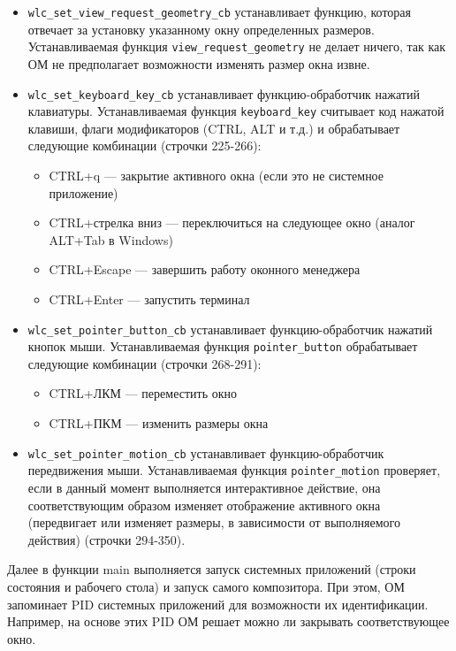 \begin{itemize}
\item \texttt{wlc\_set\_view\_request\_geometry\_cb} устанавливает функцию, которая отвечает за установку указанному окну определенных размеров. Устанавливаемая функция \texttt{view\_request\_geometry} не делает ничего, так как ОМ не предполагает возможности изменять размер окна извне.

\item \texttt{wlc\_set\_keyboard\_key\_cb} устанавливает функцию-обработчик нажатий клавиатуры. Устанавливаемая функция \texttt{keyboard\_key} считывает код нажатой клавиши, флаги модификаторов (CTRL, ALT и т.д.) и обрабатывает следующие комбинации (строчки 225-266):
\begin{itemize}
\item CTRL+q --- закрытие активного окна (если это не системное приложение)
\item CTRL+стрелка вниз --- переключиться на следующее окно (аналог ALT+Tab в Windows)
\item CTRL+Escape --- завершить работу оконного менеджера
\item CTRL+Enter --- запустить терминал
\end{itemize}

\item \texttt{wlc\_set\_pointer\_button\_cb} устанавливает функцию-обработчик нажатий кнопок мыши. Устанавливаемая функция \texttt{pointer\_button} обрабатывает следующие комбинации (строчки 268-291):
\begin{itemize}
\item CTRL+ЛКМ --- переместить окно
\item CTRL+ПКМ --- изменить размеры окна
\end{itemize}

\item \texttt{wlc\_set\_pointer\_motion\_cb} устанавливает функцию-обработчик передвижения мыши. Устанавливаемая функция \texttt{pointer\_motion} проверяет, если в данный момент выполняется интерактивное действие, она соответствующим образом изменяет отображение активного окна (передвигает или изменяет размеры, в зависимости от выполняемого действия) (строчки 294-350).
\end{itemize}

Далее в функции main выполняется запуск системных приложений (строки состояния и рабочего стола) и запуск самого композитора. При этом, ОМ запоминает PID системных приложений для возможности их идентификации. Например, на основе этих PID ОМ решает можно ли закрывать соответствующее окно.

